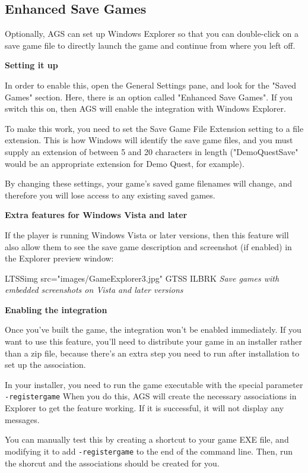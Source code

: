 \subsection{Enhanced Save Games}\label{EnhancedSaveGames}%

Optionally, AGS can set up Windows Explorer so that you can double-click on a save game
file to directly launch the game and continue from where you left off.

\bf{Setting it up}

In order to enable this, open the General Settings pane, and look for the "Saved Games"
section. Here, there is an option called "Enhanced Save Games". If you switch this on,
then AGS will enable the integration with Windows Explorer.

To make this work, you need to set the Save Game File Extension setting to a file extension.
This is how Windows will identify the save game files, and you must supply an extension
of between 5 and 20 characters in length ("DemoQuestSave" would be an appropriate
extension for Demo Quest, for example).

By changing these settings, your game's saved game filenames will change, and therefore
you will lose access to any existing saved games.

\bf{Extra features for Windows Vista and later}

If the player is running Windows Vista or later versions, then this feature will also allow them to see
the save game description and screenshot (if enabled) in the Explorer preview window:

LTSSimg src="images/GameExplorer3.jpg" GTSS ILBRK
\it{Save games with embedded screenshots on Vista and later versions}

\bf{Enabling the integration}

Once you've built the game, the integration won't be enabled immediately. If you want to
use this feature, you'll need to distribute your game in an installer rather than a zip
file, because there's an extra step you need to run after installation to set up the
association.

In your installer, you need to run the game executable with the special
parameter \verb$-registergame$  When you do this, AGS will create the necessary
associations in Explorer to get the feature working. If it is successful, it will
not display any messages.

You can manually test this by creating a shortcut to your game EXE file, and modifying
it to add \verb$-registergame$ to the end of the command line. Then, run the shorcut
and the associations should be created for you.

